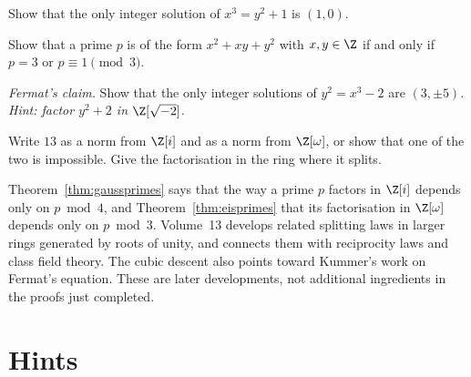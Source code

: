 \begin{exercise}[$\star\star$]\label{ex:x3y21}
Show that the only integer solution of $x^3=y^2+1$ is $(1,0)$.
\end{exercise}

\begin{exercise}[$\star\star$]\label{ex:xxyy}
Show that a prime $p$ is of the form $x^2+xy+y^2$ with $x,y\in\Z$ if and only if $p=3$ or $p\equiv1\pmod3$.
\end{exercise}

\begin{exercise}[$\star\star\star$]\label{ex:y2x3m2}
\emph{Fermat's claim.} Show that the only integer solutions of $y^2=x^3-2$ are $(3,\pm5)$. \emph{Hint: factor $y^2+2$ in $\Z[\sqrt{-2}]$.}
\end{exercise}

\begin{exercise}[$\star$]\label{ex:t1-split13}
Write $13$ as a norm from $\Z[i]$ and as a norm from $\Z[\omega]$, or show that one of the two is impossible. Give the factorisation in the ring where it splits.
\end{exercise}

\begin{beauty}
Theorem~\ref{thm:gaussprimes} says that the way a prime $p$ factors in $\Z[i]$ depends only on $p\bmod4$, and Theorem~\ref{thm:eisprimes} that its factorisation in $\Z[\omega]$ depends only on $p\bmod3$. Volume~13 develops related splitting laws in larger rings generated by roots of unity, and connects them with reciprocity laws and class field theory. The cubic descent also points toward Kummer's work on Fermat's equation. These are later developments, not additional ingredients in the proofs just completed.
\end{beauty}

\section{Hints}

